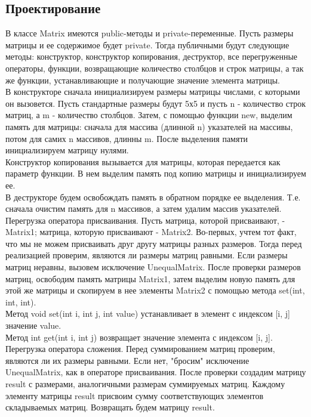 \documentclass[12pt,a4paper]{report}
\begin{document}
\subsection{Проектирование}
В классе Matrix имеются public-методы и private-переменные. Пусть размеры матрицы и ее содержимое будет private. Тогда публичными будут следующие методы: конструктор, конструктор копирования, деструктор, все перегруженные операторы, функции, возвращающие количество столбцов и строк матрицы, а так же функции, устанавливающие и получающие значение элемента матрицы. \\
В конструкторе сначала инициализируем размеры матрицы числами, с которыми он вызовется. Пусть стандартные размеры будут 5х5 и пусть n - количество строк матриц, а m - количество столбцов. Затем, с помощью функции new, выделим память для матрицы: сначала для массива (длинной n) указателей на массивы, потом для самих n массивов, длинны m. После выделения памяти инициализируем матрицу нулями. \\
Конструктор копирования вызывается для матрицы, которая передается как параметр функции. В нем выделим память под копию матрицы и инициализируем ее. \\
В деструкторе будем освобождать память в обратном порядке ее выделения. Т.е. сначала очистим память для n массивов, а затем удалим массив указателей. \\
Перегрузка оператора присваивания. Пусть матрица, которой присваивают, - Matrix1; матрица, которую присваивают - Matrix2. Во-первых, учтем тот факт, что мы не можем присваивать друг другу матрицы разных размеров. Тогда перед реализацией проверим, являются ли размеры матриц равными. Если размеры матриц неравны, вызовем исключение UnequalMatrix. После проверки размеров матриц, освободим память матрицы Matrix1, затем выделим новую память для этой же матрицы и скопируем в нее элементы Matrix2 с помощью метода set(int, int, int).\\
Метод void set(int i, int j, int value) устанавливает в элемент с индексом [i, j] значение value. \\
Метод int get(int i, int j) возвращает значение элемента с индексом [i, j]. \\
Перегрузка оператора сложения. Перед суммированием матриц проверим, являются ли их размеры равными. Если нет, "бросим" исключение UnequalMatrix, как в операторе присваивания. После проверки создадим матрицу result с размерами, аналогичными размерам суммируемых матриц. Каждому элементу матрицы result присвоим сумму соответствующих элементов складываемых матриц. Возвращать будем матрицу result. \\
\end{document}
